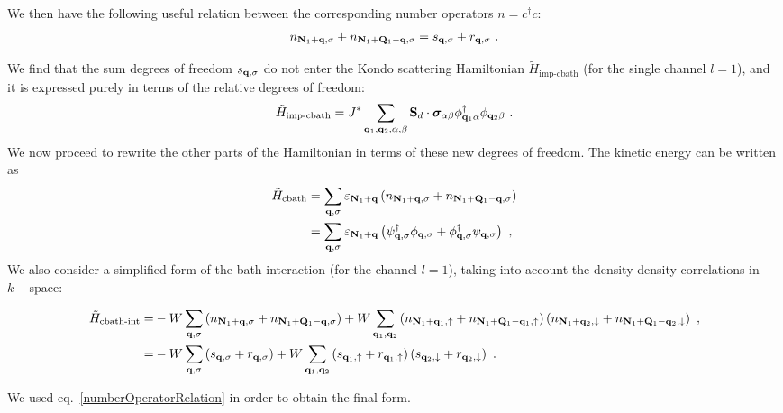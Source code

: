 \documentclass[reprint,hidelinks,onecolumn]{revtex4-2}
\begin{document}
We then have the following useful relation between the corresponding number operators \(n = c^\dagger c\):
\begin{equation}\begin{aligned}\label{numberOperatorRelation}
	n_{{\bf N}_1 + {\bf q},\sigma} + n_{{\bf N}_1 + {\bf Q}_1 - {\bf q}, \sigma} = s_{{\bf q}, \sigma} + r_{{\bf q},\sigma}~.
\end{aligned}\end{equation}

We find that the sum degrees of freedom \(s_{{\bf q},\sigma}\) do not enter the Kondo scattering Hamiltonian \(\tilde H_\text{imp-cbath}\) (for the single channel \(l=1\)), and it is expressed purely in terms of the relative degrees of freedom:
\begin{equation}\begin{aligned}
	\tilde H_\text{imp-cbath} = J^*\sum_{{\bf q}_1, {\bf q}_2,\alpha,\beta}{\bf S}_d\cdot{\boldsymbol\sigma}_{\alpha\beta} {\phi}^\dagger_{{\bf q}_1\alpha} \phi_{{\bf q}_2\beta}~.
\end{aligned}\end{equation}
We now proceed to rewrite the other parts of the Hamiltonian in terms of these new degrees of freedom. The kinetic energy can be written as
\begin{equation}\begin{aligned}\label{kineticEnergy}
	\tilde H_\text{cbath} &= \sum_{{\bf q},\sigma}\varepsilon_{{\bf N}_1 + {\bf q}}\left(n_{{\bf N}_1 + {\bf q},\sigma} + n_{{\bf N}_1 + {\bf Q}_1 - {\bf q},\sigma}\right)\\
						  &= \sum_{{\bf q},\sigma}\varepsilon_{{\bf N}_1 + {\bf q}}\left({\psi}^\dagger_{{\bf q},\sigma} {\phi}_{{\bf q},\sigma} + {\phi}^\dagger_{{\bf q},\sigma} \psi_{{\bf q},\sigma}\right)~,
\end{aligned}\end{equation}
We also consider a simplified form of the bath interaction (for the channel \(l=1\)), taking into account the density-density correlations in \(k-\)space:
\begin{widetext}
\begin{equation}\begin{aligned}
	\tilde H_\text{cbath-int} =& -W\sum_{{\bf q},\sigma}\left(n_{{\bf N}_1 + {\bf q},\sigma} + n_{{\bf N}_1 + {\bf Q}_1 - {\bf q},\sigma}\right) + W\sum_{{\bf q}_1,{\bf q}_2}\left(n_{{\bf N}_{1} + {\bf q}_1, \uparrow} + n_{{\bf N}_{1} + {\bf Q}_{1} - {\bf q}_1, \uparrow} \right) \left( n_{{\bf N}_{1} + {\bf q}_2, \downarrow} + n_{{\bf N}_{1} + {\bf Q}_{1} - {\bf q}_2, \downarrow} \right)~,\\
	=& -W\sum_{{\bf q},\sigma}\left(s_{{\bf q},\sigma} + r_{{\bf q},\sigma}\right) + W\sum_{{\bf q}_1,{\bf q}_2}\left(s_{{\bf q}_1,\uparrow} + r_{{\bf q}_1,\uparrow}\right) \left(s_{{\bf q}_2,\downarrow} + r_{{\bf q}_2,\downarrow}\right)~.
\end{aligned}\end{equation}
\end{widetext}
We used eq.~\ref{numberOperatorRelation} in order to obtain the final form. 
\end{document}
